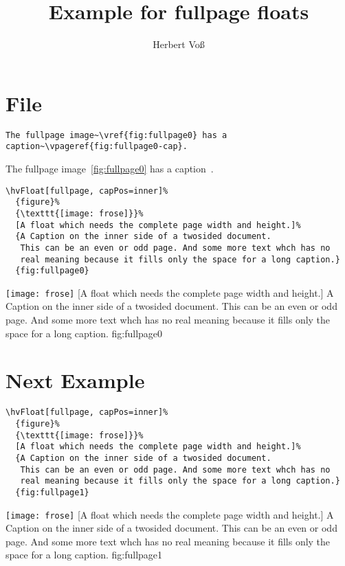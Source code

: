 \documentclass{scrartcl}
\begin{document}
\title{Example for fullpage floats}
\author{Herbert Voß}
\maketitle

\tableofcontents

\blinddocument

\section{File \texttt{\jobname}}

\begin{lstlisting}
The fullpage image~\vref{fig:fullpage0} has a caption~\vpageref{fig:fullpage0-cap}.
\end{lstlisting}

The fullpage image~\vref{fig:fullpage0} has a caption~.

\begin{lstlisting}
\hvFloat[fullpage, capPos=inner]%
  {figure}%
  {\texttt{[image: frose]}}%
  [A float which needs the complete page width and height.]%
  {A Caption on the inner side of a twosided document. 
   This can be an even or odd page. And some more text whch has no
   real meaning because it fills only the space for a long caption.}
  {fig:fullpage0}
\end{lstlisting}

\Float[capPos=e]
%
  {\texttt{[image: frose]}}%
  [A float which needs the complete page width and height.]%
  {A Caption on the inner side of a twosided document. 
   This can be an even or odd page. And some more text whch has no
   real meaning because it fills only the space for a long caption.}
  {fig:fullpage0}

\blinddocument

\section{Next Example}

\begin{lstlisting}
\hvFloat[fullpage, capPos=inner]%
  {figure}%
  {\texttt{[image: frose]}}%
  [A float which needs the complete page width and height.]%
  {A Caption on the inner side of a twosided document. 
   This can be an even or odd page. And some more text whch has no
   real meaning because it fills only the space for a long caption.}
  {fig:fullpage1}
\end{lstlisting}


\Float[capPos=e]
%
  {\texttt{[image: frose]}}%
  [A float which needs the complete page width and height.]%
  {A Caption on the inner side of a twosided document. 
   This can be an even or odd page. And some more text whch has no
   real meaning because it fills only the space for a long caption.}
  {fig:fullpage1}

\blinddocument


\Blindtext
\end{document}
